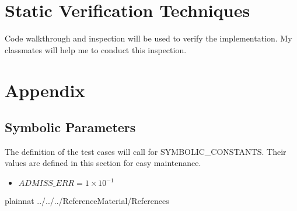 \documentclass[12pt, titlepage]{article}
\begin{document}
\section{Static Verification Techniques}

Code walkthrough and inspection will be used to verify the implementation. My 
classmates will help me to conduct this inspection.
				


\newpage

\section{Appendix}



\subsection{Symbolic Parameters}

The definition of the test cases will call for SYMBOLIC\_CONSTANTS.
Their values are defined in this section for easy maintenance.
\begin{itemize}
	\item $ADMISS\_ERR = 1 \times 10^{-1}$
\end{itemize}





 {plainnat}
 {../../../ReferenceMaterial/References}
\end{document}
